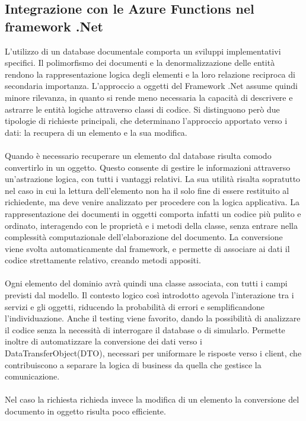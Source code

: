 \subsection{Integrazione con le Azure Functions nel framework .Net}
L'utilizzo di un database documentale comporta un sviluppi implementativi specifici.
Il polimorfismo dei documenti e la denormalizzazione delle entità
rendono la rappresentazione logica degli elementi e la loro relazione reciproca di secondaria importanza.
L'approccio a oggetti del Framework .Net assume quindi minore rilevanza,
in quanto si rende meno necessaria la capacità di descrivere e astrarre
le entità logiche attraverso classi di codice.
Si distinguono però due tipologie di richieste principali,
che determinano l'approccio apportato verso i dati:
la recupera di un elemento e la sua modifica.\\
\\
Quando è necessario recuperare un elemento dal database risulta comodo
convertirlo in un oggetto.
Questo consente di gestire le informazioni attraverso un'astrazione logica, con tutti i vantaggi relativi.
La sua utilità risalta sopratutto nel caso in cui la lettura dell'elemento
non ha il solo fine di essere restituito al richiedente,
ma deve venire analizzato per procedere con la logica applicativa.
La rappresentazione dei documenti in oggetti comporta infatti un codice più pulito e ordinato,
interagendo con le proprietà e i metodi della classe, senza entrare nella complessità computazionale
dell'elaborazione del documento.
La conversione viene svolta automaticamente dal framework,
e permette di associare ai dati il codice strettamente relativo, creando metodi appositi.\\
\\
Ogni elemento del dominio avrà quindi una classe associata,
con tutti i campi previsti dal modello.
Il contesto logico così introdotto agevola l'interazione tra i servizi e gli oggetti,
riducendo la probabilità di errori e semplificandone l'individuazione.
Anche il testing viene favorito, dando la possibilità di analizzare il codice
senza la necessità di interrogare il database o di simularlo.
Permette inoltre di automatizzare la conversione dei dati verso i DataTransferObject(DTO),
necessari per uniformare le risposte verso i client,
che contribuiscono a separare la logica di business da quella che gestisce la comunicazione.\\
\\
Nel caso la richiesta richieda invece la modifica di un elemento
la conversione del documento in oggetto risulta poco efficiente.
